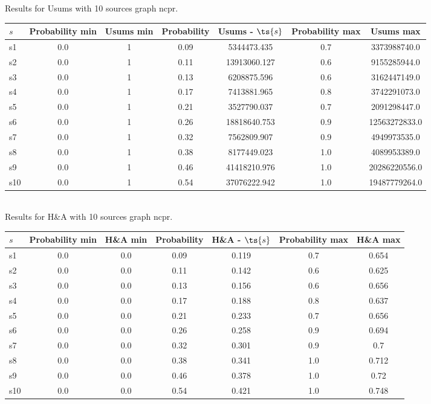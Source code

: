 \documentclass{article}
\begin{document}
\noindent Results for Usums with 10 sources graph ncpr.

\noindent\begin{tabular}{|l|c|c|c|c|c|c|}
\hline
$s$& Probability min & Usums min & Probability & Usums - $\ts{s}$ & Probability max & Usums max\\
\hline
s1 &0.0 & 1 & 0.09 & 5344473.435 & 0.7 & 3373988740.0\\
\hline
s2 &0.0 & 1 & 0.11 & 13913060.127 & 0.6 & 9155285944.0\\
\hline
s3 &0.0 & 1 & 0.13 & 6208875.596 & 0.6 & 3162447149.0\\
\hline
s4 &0.0 & 1 & 0.17 & 7413881.965 & 0.8 & 3742291073.0\\
\hline
s5 &0.0 & 1 & 0.21 & 3527790.037 & 0.7 & 2091298447.0\\
\hline
s6 &0.0 & 1 & 0.26 & 18818640.753 & 0.9 & 12563272833.0\\
\hline
s7 &0.0 & 1 & 0.32 & 7562809.907 & 0.9 & 4949973535.0\\
\hline
s8 &0.0 & 1 & 0.38 & 8177449.023 & 1.0 & 4089953389.0\\
\hline
s9 &0.0 & 1 & 0.46 & 41418210.976 & 1.0 & 20286220556.0\\
\hline
s10 &0.0 & 1 & 0.54 & 37076222.942 & 1.0 & 19487779264.0\\
\hline
\end{tabular}\\

\noindent Results for H\&A with 10 sources graph ncpr.

\noindent\begin{tabular}{|l|c|c|c|c|c|c|}
\hline
$s$& Probability min & H\&A min & Probability & H\&A - $\ts{s}$ & Probability max & H\&A max\\
\hline
s1 &0.0 & 0.0 & 0.09 & 0.119 & 0.7 & 0.654\\
\hline
s2 &0.0 & 0.0 & 0.11 & 0.142 & 0.6 & 0.625\\
\hline
s3 &0.0 & 0.0 & 0.13 & 0.156 & 0.6 & 0.656\\
\hline
s4 &0.0 & 0.0 & 0.17 & 0.188 & 0.8 & 0.637\\
\hline
s5 &0.0 & 0.0 & 0.21 & 0.233 & 0.7 & 0.656\\
\hline
s6 &0.0 & 0.0 & 0.26 & 0.258 & 0.9 & 0.694\\
\hline
s7 &0.0 & 0.0 & 0.32 & 0.301 & 0.9 & 0.7\\
\hline
s8 &0.0 & 0.0 & 0.38 & 0.341 & 1.0 & 0.712\\
\hline
s9 &0.0 & 0.0 & 0.46 & 0.378 & 1.0 & 0.72\\
\hline
s10 &0.0 & 0.0 & 0.54 & 0.421 & 1.0 & 0.748\\
\hline
\end{tabular}\\
\end{document}

